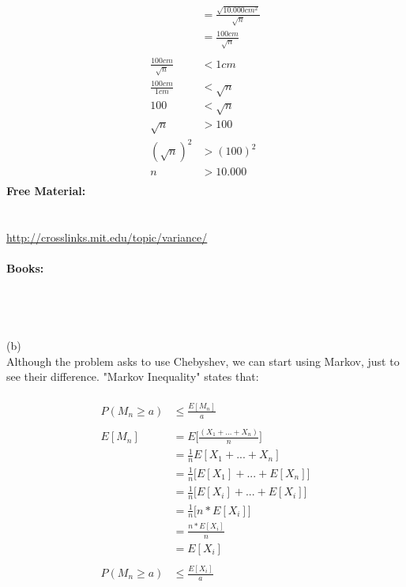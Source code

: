 \documentclass[10pt,a4paper]{article}
\begin{document}
	\begin{align*}
		&= \frac{\sqrt{10.000cm^2}}{\sqrt{n}}\\
		&= \frac{100cm}{\sqrt{n}}\\
		\\		
		\frac{100cm}{\sqrt{n}} &< 1cm\\
		\frac{100cm}{1cm} &< \sqrt{n}\\
		100 &< \sqrt{n}\\
		\sqrt{n} &> 100\\
		(\sqrt{n})^2 &> (100)^2\\
		n &> 10.000\\
	\end{align*}
	\newpage
	\textbf{Free Material:}\\
	\\
	\cite[section 19.3, page 798]{MIT6042}\\
	\url{http://crosslinks.mit.edu/topic/variance/}\\
	\\
	\textbf{Books:}\\
	\\
	\cite[section 2.4, page 81]{dimitriIntro}\\
	\cite[section 4.5, page 132]{sheldonrossIntroProb}\\
	\\
	(b)\\
	Although the problem asks to use Chebyshev, we can start using Markov, just to see their difference. "Markov Inequality" states that:\\
	\\
	\begin{align*}
		P(M_n \ge a) &\le \frac{E[M_n]}{a}\\
		\\
		E[M_n] &= E\bigg[\frac{(X_1 + ... + X_n)}{n} \bigg]\\
		&= \frac{1}{n} E[X_1 + ... + X_n]\\
		&= \frac{1}{n} \bigg[ E[X_1] + ... + E[X_n] \bigg]\\
		&= \frac{1}{n} \bigg[ E[X_i] + ... + E[X_i] \bigg]\\
		&= \frac{1}{n} \bigg[ n*E[X_i] \bigg]\\
		&= \frac{n*E[X_i]}{n}\\
		&= E[X_i]\\
		\\
		P(M_n \ge a) &\le \frac{E[X_i]}{a}\\
	\end{align*}	
	\\
\end{document}
